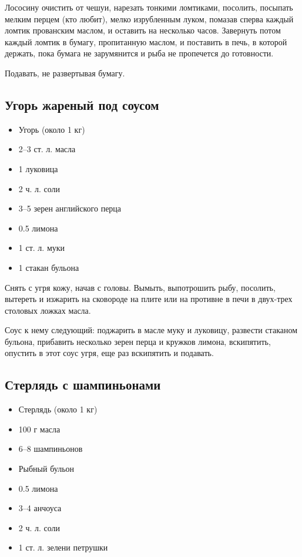 Лососину очистить от чешуи, нарезать тонкими ломтиками, посолить, посыпать мелким перцем (кто любит), мелко изрубленным луком, помазав сперва каждый ломтик прованским маслом, и оставить на несколько часов. Завернуть потом каждый ломтик в бумагу, пропитанную маслом, и поставить в печь, в которой держать, пока бумага не зарумянится и рыба не пропечется до готовности.

Подавать, не развертывая бумагу.

\subsection{Угорь жареный под соусом}

\begin{itemize} 
	\item  Угорь (около 1 кг) 
    \item  2–3 ст. л. масла 
    \item  1 луковица 
    \item  2 ч. л. соли 
    \item  3–5 зерен английского перца 
    \item  0.5 лимона 
    \item  1 ст. л. муки 
    \item  1 стакан бульона
\end{itemize}

Снять с угря кожу, начав с головы. Вымыть, выпотрошить рыбу, посолить, вытереть и изжарить на сковороде на плите или на противне в печи в двух-трех столовых ложках масла.

Соус к нему следующий: поджарить в масле муку и луковицу, развести стаканом бульона, прибавить несколько зерен перца и кружков лимона, вскипятить, опустить в этот соус угря, еще раз вскипятить и подавать.

\subsection{Стерлядь с шампиньонами}

\begin{itemize} 
	\item  Стерлядь (около 1 кг) 
    \item  100 г масла 
    \item  6–8 шампиньонов 
    \item  Рыбный бульон 
    \item  0.5 лимона 
    \item  3–4 анчоуса 
    \item  2 ч. л. соли 
    \item  1 ст. л. зелени петрушки
\end{itemize}


